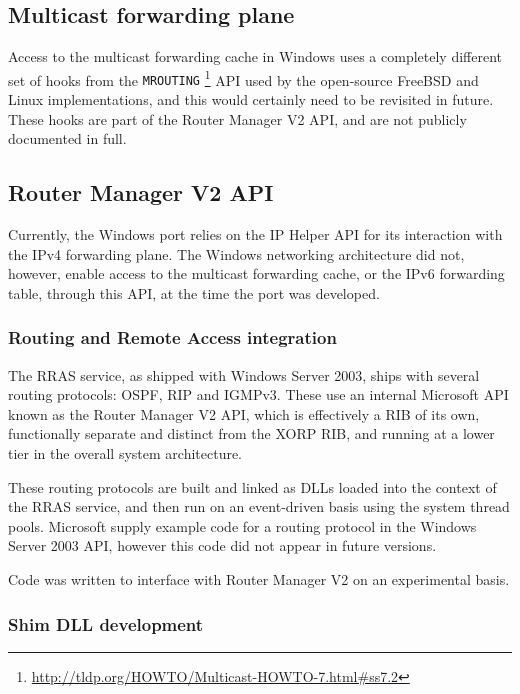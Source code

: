 \documentclass[11pt]{article}
\begin{document}
{{%
\subsection{Multicast forwarding plane}

Access to the multicast forwarding cache in Windows uses a completely
different set of hooks from the {\tt MROUTING}
\footnote{\url{http://tldp.org/HOWTO/Multicast-HOWTO-7.html#ss7.2}}
API used by the open-source
FreeBSD and Linux implementations, and this would certainly need to be
revisited in future. These hooks are part of the Router Manager V2 API,
and are not publicly documented in full.

\subsection{Router Manager V2 API}

Currently, the Windows port relies on the IP Helper API for its interaction
with the IPv4 forwarding plane. The Windows networking architecture did
not, however, enable access to the multicast forwarding cache, or the IPv6
forwarding table, through this API, at the time the port was developed.

\subsubsection{Routing and Remote Access integration}
 
The RRAS service, as shipped with Windows Server 2003, ships with several
routing protocols: OSPF, RIP and IGMPv3. These use an internal Microsoft
API known as the Router Manager V2 API, which is effectively a RIB of its own,
functionally separate and distinct from the XORP RIB, and running at a lower
tier in the overall system architecture.

These routing protocols are built and linked as DLLs
loaded into the context of the RRAS service, and then run on an event-driven
basis using the system thread pools. Microsoft supply example code for a routing
protocol in the Windows Server 2003 API, however this code did not appear
in future versions.

Code was written to interface with Router Manager V2 on an experimental basis.

\subsubsection{Shim DLL development}

}}
\end{document}
